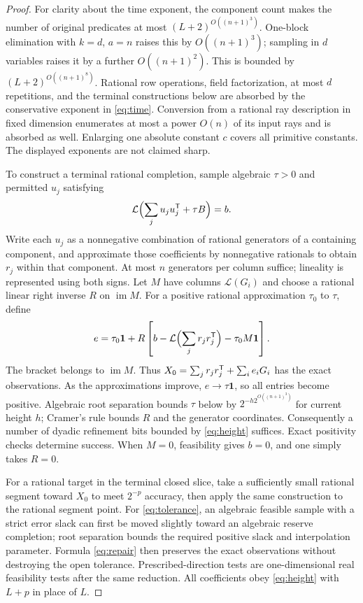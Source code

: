 \begin{proof}
For clarity about the time exponent, the component count makes the number of original predicates at most $(L+2)^{O((n+1)^3)}$. One-block elimination with $k=d$, $a=n$ raises this by $O((n+1)^3)$; sampling in $d$ variables raises it by a further $O((n+1)^2)$. This is bounded by $(L+2)^{O((n+1)^8)}$. Rational row operations, field factorization, at most $d$ repetitions, and the terminal constructions below are absorbed by the conservative exponent in \eqref{eq:time}. Conversion from a rational ray description in fixed dimension enumerates at most a power $O(n)$ of its input rays and is absorbed as well. Enlarging one absolute constant $c$ covers all primitive constants. The displayed exponents are not claimed sharp.

To construct a terminal rational completion, sample algebraic $\tau>0$ and permitted $u_j$ satisfying
\[
 \mathcal L\Bigl(\sum_ju_ju_j^{\mathsf T}+\tau B\Bigr)=b.
\]
Write each $u_j$ as a nonnegative combination of rational generators of a containing component, and approximate those coefficients by nonnegative rationals to obtain $r_j$ within that component. At most $n$ generators per column suffice; lineality is represented using both signs. Let $M$ have columns $\mathcal L(G_i)$ and choose a rational linear right inverse $R$ on $\operatorname{im}M$. For a positive rational approximation $\tau_0$ to $\tau$, define
\begin{equation}\label{eq:repair}
 e=\tau_0\mathbf1+R\left[b-\mathcal L\Bigl(\sum_jr_jr_j^{\mathsf T}\Bigr)-\tau_0M\mathbf1\right].
\end{equation}
The bracket belongs to $\operatorname{im}M$. Thus $X_0=\sum_jr_jr_j^{\mathsf T}+\sum_ie_iG_i$ has the exact observations. As the approximations improve, $e\to\tau\mathbf1$, so all entries become positive. Algebraic root separation bounds $\tau$ below by $2^{-h2^{O((n+1)^3)}}$ for current height $h$; Cramer's rule bounds $R$ and the generator coordinates. Consequently a number of dyadic refinement bits bounded by \eqref{eq:height} suffices. Exact positivity checks determine success. When $M=0$, feasibility gives $b=0$, and one simply takes $R=0$.

For a rational target in the terminal closed slice, take a sufficiently small rational segment toward $X_0$ to meet $2^{-p}$ accuracy, then apply the same construction to the rational segment point. For \eqref{eq:tolerance}, an algebraic feasible sample with a strict error slack can first be moved slightly toward an algebraic reserve completion; root separation bounds the required positive slack and interpolation parameter. Formula \eqref{eq:repair} then preserves the exact observations without destroying the open tolerance. Prescribed-direction tests are one-dimensional real feasibility tests after the same reduction. All coefficients obey \eqref{eq:height} with $L+p$ in place of $L$.


\end{proof}
